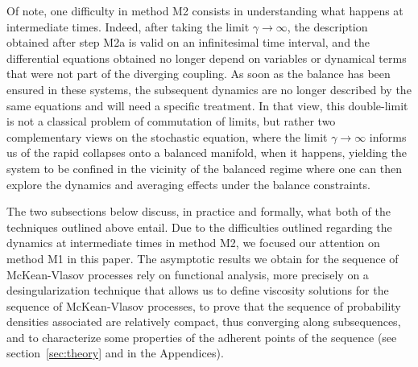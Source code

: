 \documentclass[onefignum,onetabnum]{siamart190516}
\newcommand{\1}{\mathbbm{1}}
\newcommand{\review}[1]{\textcolor{midblue}{ #1}}
\renewcommand{\review}[1]{{ #1}}
\begin{document}
\review{ Of note, one difficulty in method M2 consists in understanding what happens at intermediate times. Indeed, after taking the limit $\gamma\to\infty$, the description obtained after step M2a is valid on an infinitesimal time interval, and the differential equations obtained no longer depend on variables or dynamical terms that were not part of the diverging coupling. As soon as the balance has been ensured in these systems, the subsequent dynamics are no longer described by the same equations and will need a specific treatment. In that view, this double-limit is not a classical problem of commutation of limits, but rather two complementary views on the stochastic equation, where the limit $\gamma\to \infty$ informs us of the rapid collapses onto a balanced manifold, when it happens, yielding the system to be confined in the vicinity of the balanced regime where one can then explore the dynamics and averaging effects under the balance constraints.}

\review{The two subsections below discuss, in practice and formally, what both of the techniques outlined above entail. Due to the difficulties outlined regarding the dynamics at intermediate times in method M2, we focused our attention on method M1 in this paper. The asymptotic results we obtain for the sequence of McKean-Vlasov processes rely on functional analysis, more precisely on a desingularization technique that allows us to define viscosity solutions for the sequence of McKean-Vlasov processes, to prove that the sequence of probability densities associated are relatively compact, thus converging along subsequences, and to characterize some properties of the adherent points of the sequence (see section~\ref{sec:theory} and in the Appendices).}
\end{document}

